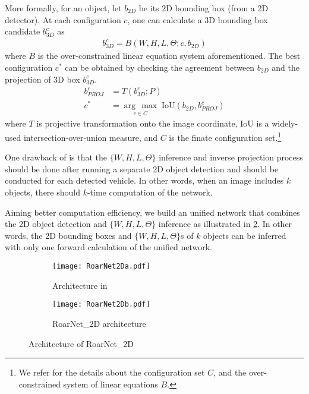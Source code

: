 \documentclass[letterpaper, 10 pt, conference]{ieeeconf}
\newcommand{\argmax}[1]{\underset{#1}{\operatorname{arg}\,\operatorname{max}}\;}
\begin{document}
More formally, for an object, let $b_{2D}$ be its 2D bounding box (from a 2D detector). At each configuration $c$, one can calculate a 3D bounding box candidate $b_{3D}^{c}$ as
\begin{align}
b_{3D}^{c} = B(W,H,L,\Theta; c, b_{2D}) \label{eq:lin}
\end{align}
where $B$ is the over-constrained linear equation system aforementioned.
The best configuration $c^{*}$ can be obtained by checking the agreement between $b_{2D}$ and the projection of 3D box $b_{3D}^{c}$.
\begin{align}
b_{PROJ}^{c} &= T(b_{3D}^{c}; P) \\
c^{*} &= \argmax{c\in C} \text{IoU}(b_{2D}, b_{PROJ}^{c})
\end{align}
where $T$ is projective transformation onto the image coordinate, $\text{IoU}$ is a widely-used intersection-over-union measure, and $C$ is the finate configuration set.\footnote{We refer \cite{mousavian_3d_2017} for the details about the configuration set $C$, and the over-constrained system of linear equations $B$.}


One drawback of \cite{mousavian_3d_2017} is that the $\{W,H,L,\Theta\}$ inference and inverse projection process should be done after running a separate 2D object detection and should be conducted for each detected vehicle. In other words, when an image includes $k$ objects, there should $k$-time computation of the network.

Aiming better computation efficiency, we build an unified network that combines the 2D object detection and $\{W,H,L,\Theta\}$ inference as illustrated in \cref{fig:gas}. In other words, the 2D bounding boxes and $\{W,H,L,\Theta\}$s of $k$ objects can be inferred with only one forward calculation of the unified network.

\begin{figure}
	\centering
	\begin{subfigure}{0.47\linewidth}
		\centering
		\texttt{[image: RoarNet2Da.pdf]}
		\caption{Architecture in \cite{mousavian_3d_2017}}\label{fig:mousavian}
	\end{subfigure}
    \hfill
    \begin{subfigure}{0.48\linewidth}
		\centering
        \texttt{[image: RoarNet2Db.pdf]}
\caption{RoarNet\_2D architecture}\label{fig:gas}
	\end{subfigure}
\caption{Architecture of RoarNet\_2D \label{fig:roar2d}}
\end{figure}
\end{document}
